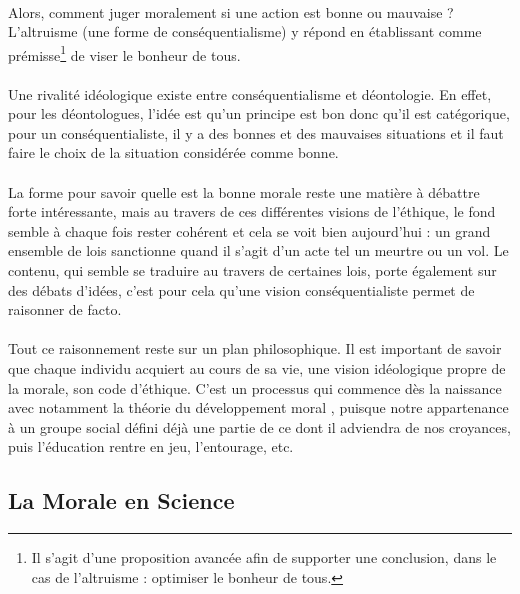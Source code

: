 \documentclass[10pt, french, a4paper]{report}
\begin{document}
\paragraph{}
Alors, comment juger moralement si une action est bonne ou mauvaise ? L’altruisme (une forme de conséquentialisme) y répond en établissant comme prémisse\footnote{Il s'agit d'une proposition avancée afin de supporter une conclusion, dans le cas de l'altruisme : optimiser le bonheur de tous.} de viser le bonheur de tous.

\paragraph{}
Une rivalité idéologique existe entre conséquentialisme et déontologie. En effet, pour les déontologues, l’idée est qu’un principe est bon donc qu’il est catégorique, pour un conséquentialiste, il y a des bonnes et des mauvaises situations et il faut faire le choix de la situation considérée comme bonne.

\paragraph{}
La forme pour savoir quelle est la bonne morale reste une matière à débattre forte intéressante, mais au travers de ces différentes visions de l’éthique, le fond semble à chaque fois rester cohérent et cela se voit bien aujourd’hui : un grand ensemble de lois sanctionne quand il s’agit d’un acte tel un meurtre ou un vol. Le contenu, qui semble se traduire au travers de certaines lois, porte également sur des débats d’idées, c’est pour cela qu’une vision conséquentialiste permet de raisonner de facto.

\paragraph{}
Tout ce raisonnement reste sur un plan philosophique. Il est important de savoir que chaque individu acquiert au cours de sa vie, une vision idéologique propre de la morale, son code d’éthique. C’est un processus qui commence dès la naissance avec notamment la théorie du développement moral \citep{kohlberg_moral_1977}, puisque notre appartenance à un groupe social défini déjà une partie de ce dont il adviendra de nos croyances, puis l’éducation rentre en jeu, l’entourage, etc.

\subsection{La Morale en Science}
\end{document}
